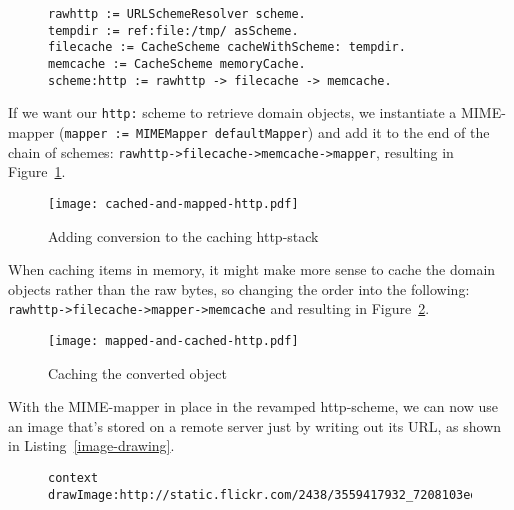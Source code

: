 \documentclass[preprint,authoryear]{llncs}
\begin{document}
\begin{figure}[htbp]
\begin{lstlisting}[style=numbers,label=http-composed-listing,caption=Code for caching http stack.]
rawhttp := URLSchemeResolver scheme.
tempdir := ref:file:/tmp/ asScheme.
filecache := CacheScheme cacheWithScheme: tempdir.
memcache := CacheScheme memoryCache.
scheme:http := rawhttp -> filecache -> memcache.
\end{lstlisting}
\end{figure}

If we want our {\tt http:} scheme to retrieve domain objects, we instantiate a MIME-mapper
({\tt mapper := MIMEMapper defaultMapper}) and add it to the end of the chain of schemes: 
{\tt rawhttp->filecache->memcache->mapper}, resulting in Figure~\ref{http-cached-converted}.


\begin{figure}[htbp]
\begin{center}
\texttt{[image: cached-and-mapped-http.pdf]}
\caption{Adding conversion to the caching http-stack}
\label{http-cached-converted}
\end{center}
\end{figure}

When caching items in memory, it might make more sense to cache the domain objects
rather than the raw bytes, so changing the order into the following: {\tt rawhttp->filecache->mapper->memcache}
and resulting in Figure~\ref{http-converted-cached}.

\begin{figure}[htbp]
\begin{center}
\texttt{[image: mapped-and-cached-http.pdf]}
\caption{Caching the converted object}
\label{http-converted-cached}
\end{center}
\end{figure}


With the MIME-mapper in place in the revamped http-scheme, we can now use 
an image that's stored on a remote server just by writing out its URL, as shown
in Listing~\ref{image-drawing}.

\begin{figure}[htbp]
\begin{lstlisting}[style=L,label=image-drawing,caption=Drawing a remote image via {\tt http:}.]
context drawImage:http://static.flickr.com/2438/3559417932_7208103ed8_m.jpg
\end{lstlisting}
\end{figure}
\end{document}
